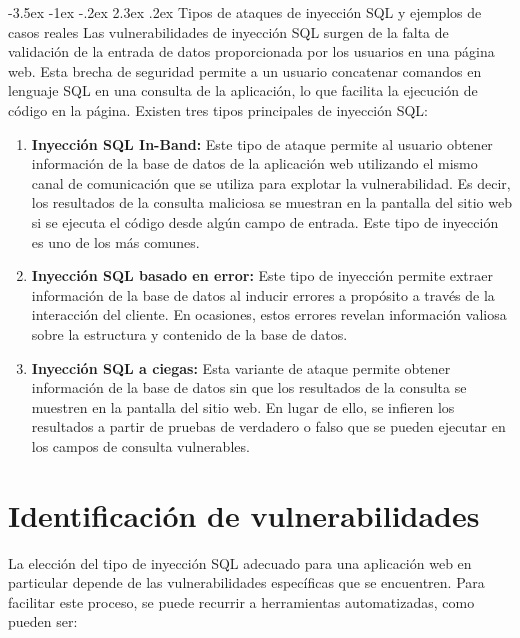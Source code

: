\documentclass[11pt]{report}
\makeatletter
\renewcommand\chapter{\@startsection{chapter}{0}{\z@}%
    {-3.5ex \@plus -1ex \@minus -.2ex}%
    {2.3ex \@plus.2ex}%
    {\normalfont\Large\bfseries}}
\makeatother
\begin{document}
\chapter{Tipos de ataques de inyección SQL y ejemplos de casos reales}
Las vulnerabilidades de inyección SQL surgen de la falta de validación de la entrada de datos
proporcionada por los usuarios en una página web. Esta brecha de seguridad permite a un usuario
concatenar comandos en lenguaje SQL en una consulta de la aplicación, lo que facilita la ejecución
de código en la página. Existen tres tipos principales de inyección SQL:
\begin{enumerate}
  \item \textbf{Inyección SQL In-Band:} Este tipo de ataque permite al usuario obtener información de
  la base de datos de la aplicación web utilizando el mismo canal de comunicación que se utiliza para
  explotar la vulnerabilidad. Es decir, los resultados de la consulta maliciosa se muestran en la pantalla
  del sitio web si se ejecuta el código desde algún campo de entrada. Este tipo de inyección es uno de los
  más comunes.

  \item \textbf{Inyección SQL basado en error:} Este tipo de inyección permite extraer información de la base
  de datos al inducir errores a propósito a través de la interacción del cliente. En ocasiones, estos errores
  revelan información valiosa sobre la estructura y contenido de la base de datos.

  \item \textbf{Inyección SQL a ciegas:} Esta variante de ataque permite obtener información de la base de datos
  sin que los resultados de la consulta se muestren en la pantalla del sitio web. En lugar de ello, se infieren los
  resultados a partir de pruebas de verdadero o falso que se pueden ejecutar en los campos de consulta vulnerables.
\end{enumerate}

\section{Identificación de vulnerabilidades}
La elección del tipo de inyección SQL adecuado para una aplicación web en particular depende de las vulnerabilidades
específicas que se encuentren. Para facilitar este proceso, se puede recurrir a herramientas automatizadas, como pueden ser:
\end{document}
